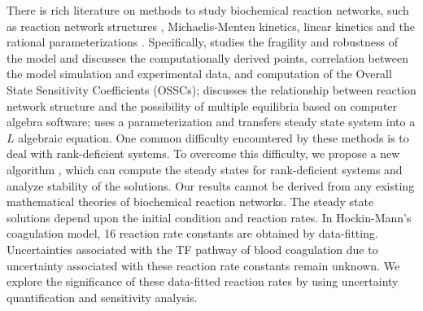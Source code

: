 There is rich literature on methods to study biochemical reaction
networks, such as reaction network structures \cite{CF},
Michaelis-Menten kinetics, linear kinetics and the rational
parameterizations \cite{TG}.  Specifically, \cite{LZV} studies the
fragility and robustness of the model and discusses the
computationally derived points, correlation between the model
simulation and experimental data, and computation of the Overall
State Sensitivity Coefficients (OSSCs); \cite{CF} discusses the
relationship between reaction network structure and the possibility
of multiple equilibria based on computer algebra software; \cite{TG}
uses a parameterization and transfers steady state system into a $L$
algebraic equation. One common difficulty encountered by these
methods is to deal with
rank-deficient systems. To overcome this difficulty, we propose a new algorithm %
, which can compute the steady states for rank-deficient systems and
analyze stability of the solutions. Our results cannot be derived
from any existing mathematical theories of biochemical reaction
networks. The steady state solutions depend upon the initial
condition and reaction rates. In Hockin-Mann's coagulation model, 16
reaction rate constants are obtained by data-fitting. Uncertainties
associated with the TF pathway of blood coagulation due to
uncertainty associated with  these reaction rate constants remain
unknown. We explore the significance of these data-fitted reaction
rates by using uncertainty quantification and sensitivity analysis.

